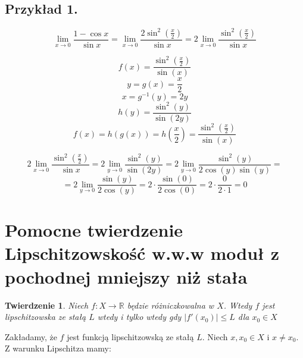 \documentclass{article}
\newtheorem*{theorem}{Twierdzenie}
\begin{document}
\subsection*{Przykład 1.}

\begin{equation*}
    \lim_{x \to 0} \frac{1 - \cos x}{\sin x} = \lim_{x \to 0} \frac{2 \sin^{2}(\frac{x}{2})}{\sin x} = 2 \lim_{x \to 0} \frac{\sin^{2}(\frac{x}{2})}{\sin x}
\end{equation*}



\begin{equation*}
    f(x) = \frac{\sin^{2}(\frac{x}{2})}{\sin(x)}
\end{equation*}
\begin{equation*}
    y = g(x) = \frac{x}{2}
\end{equation*}
\begin{equation*}
    x = g^{-1}(y) = 2y
\end{equation*}
\begin{equation*}
    h(y) = \frac{\sin^{2}(y)}{\sin(2y)}
\end{equation*}
\begin{equation*}
    f(x) = h(g(x)) = h(\frac{x}{2}) = \frac{\sin^{2}(\frac{x}{2})}{\sin(x)}
\end{equation*}

\begin{equation*}
    2 \lim_{x \to 0} \frac{\sin^{2}(\frac{x}{2})}{\sin x} = 2 \lim_{y \to 0} \frac{\sin^{2}(y)}{\sin (2y)} = 2 \lim_{y \to 0} \frac{\sin^{2}(y)}{2 \cos(y) \sin(y)} =
\end{equation*}
\begin{equation*}
    = 2 \lim_{y \to 0} \frac{\sin(y)}{2 \cos(y)} = 2 \cdot \frac{\sin(0)}{2 \cos(0)} = 2 \cdot \frac{0}{2 \cdot 1} = 0
\end{equation*}

\section{Pomocne twierdzenie Lipschitzowskość w.w.w moduł z pochodnej mniejszy niż stała}

\begin{theorem}
    Niech \(f: X \rightarrow \mathbb{R}\) będzie różniczkowalna w \(X\). Wtedy \(f\) jest lipschitzowska ze stałą \(L\) wtedy i tylko wtedy
    gdy \(|f'(x_0)| \leq L\) dla \(x_0 \in X\)
\end{theorem}

Zakładamy, że \(f\) jest funkcją lipschitzowską ze stałą \(L\). Niech \(x, x_0 \in X\) i \(x \neq x_0\). Z warunku Lipschitza
mamy:
\end{document}
